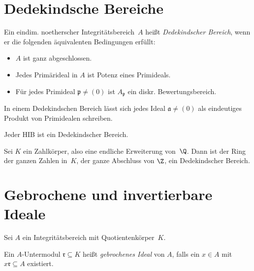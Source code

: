 \documentclass{cheat-sheet}
\newcommand{\aaa}{\mathfrak{a}}
\newcommand{\ppp}{\mathfrak{p}}
\newcommand{\rrr}{\mathfrak{r}}
\begin{document}
\section{Dedekindsche Bereiche}


\begin{lemdefn}
  Ein eindim. noetherscher Integritätsbereich~$A$ heißt \emph{Dedekindscher Bereich}, wenn er die folgenden äquivalenten Bedingungen erfüllt:
  \begin{itemize}
    \item $A$ ist ganz abgeschlossen.
    \item Jedes Primärideal in $A$ ist Potenz eines Primideals.
    \item Für jedes Primideal $\ppp \neq (0)$ ist $A_\ppp$ ein diskr. Bewertungsbereich.
  \end{itemize}
\end{lemdefn}

\begin{kor}
  In einem Dedekindschen Bereich lässt sich jedes Ideal $\aaa \neq (0)$ als eindeutiges Produkt von Primidealen schreiben.
\end{kor}


\begin{bsp}
  Jeder HIB ist ein Dedekindscher Bereich.
\end{bsp}

\begin{satz}
  Sei $K$ ein Zahlkörper, also eine endliche Erweiterung von~$\Q$.
  Dann ist der Ring der ganzen Zahlen in~$K$, \dh{} der ganze Abschluss von $\Z$, ein Dedekindscher Bereich.
\end{satz}

\section{Gebrochene und invertierbare Ideale}


Sei $A$ ein Integritätsbereich mit Quotientenkörper~$K$.

\begin{defn}
  Ein $A$-Untermodul $\rrr \subseteq K$ heißt \emph{gebrochenes Ideal} von $A$, falls ein $x \in A$ mit $x \rrr \subseteq A$ existiert.
\end{defn}
\end{document}
